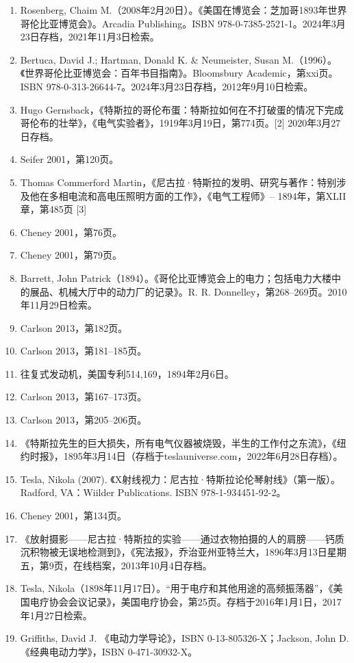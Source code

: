 \begin{enumerate}
\item Rosenberg, Chaim M.（2008年2月20日）。《美国在博览会：芝加哥1893年世界哥伦比亚博览会》。Arcadia Publishing。ISBN 978-0-7385-2521-1。2024年3月23日存档，2021年11月3日检索。  
\item Bertuca, David J.; Hartman, Donald K. & Neumeister, Susan M.（1996）。《世界哥伦比亚博览会：百年书目指南》。Bloomsbury Academic，第xxi页。ISBN 978-0-313-26644-7。2024年3月23日存档，2012年9月10日检索。  
\item Hugo Gernsback，《特斯拉的哥伦布蛋：特斯拉如何在不打破蛋的情况下完成哥伦布的壮举》，《电气实验者》，1919年3月19日，第774页。[2] 2020年3月27日存档。
\item Seifer 2001，第120页。  
\item Thomas Commerford Martin，《尼古拉·特斯拉的发明、研究与著作：特别涉及他在多相电流和高电压照明方面的工作》，《电气工程师》– 1894年，第XLII章，第485页 [3]  
\item Cheney 2001，第76页。  
\item Cheney 2001，第79页。  
\item Barrett, John Patrick（1894）。《哥伦比亚博览会上的电力；包括电力大楼中的展品、机械大厅中的动力厂的记录》。R. R. Donnelley，第268–269页。2010年11月29日检索。  
\item Carlson 2013，第182页。  
\item Carlson 2013，第181–185页。  
\item 往复式发动机，美国专利514,169，1894年2月6日。  
\item Carlson 2013，第167–173页。  
\item Carlson 2013，第205–206页。  
\item 《特斯拉先生的巨大损失，所有电气仪器被烧毁，半生的工作付之东流》，《纽约时报》，1895年3月14日（存档于teslauniverse.com，2022年6月28日存档）。
\item Tesla, Nikola (2007). 《X射线视力：尼古拉·特斯拉论伦琴射线》（第一版）。Radford, VA：Wiilder Publications. ISBN 978-1-934451-92-2。  
\item Cheney 2001，第134页。  
\item 《放射摄影——尼古拉·特斯拉的实验——通过衣物拍摄的人的肩膀——钙质沉积物被无误地检测到》，《宪法报》，乔治亚州亚特兰大，1896年3月13日星期五，第9页，在线档案，2013年10月4日存档。  
\item Tesla, Nikola（1898年11月17日）。“用于电疗和其他用途的高频振荡器”，《美国电疗协会会议记录》，美国电疗协会，第25页。存档于2016年1月1日，2017年1月27日检索。  
\item Griffiths, David J. 《电动力学导论》，ISBN 0-13-805326-X；Jackson, John D. 《经典电动力学》，ISBN 0-471-30932-X。  

\end{enumerate}
